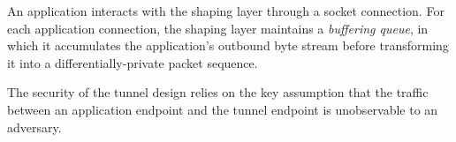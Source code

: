 An application interacts with the shaping layer through a socket connection. For
each application connection, the shaping layer maintains a {\em buffering
queue}, in which it accumulates the application's outbound byte stream before
transforming it into a differentially-private packet sequence.

The security of the tunnel design relies on the key assumption that the traffic
between an application endpoint and the tunnel endpoint is
unobservable to an adversary.

